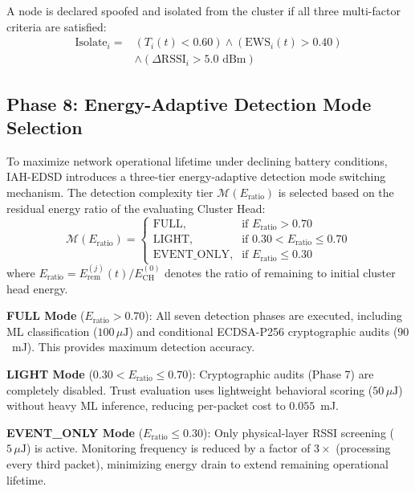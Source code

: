\documentclass[journal]{IEEEtran}
\begin{document}
A node is declared spoofed and isolated from the cluster if all three multi-factor criteria are satisfied:
\begin{equation}
\begin{aligned}
\text{Isolate}_i = &\left( T_i(t) < 0.60 \right) \land \left( \text{EWS}_i(t) > 0.40 \right) \\
&\land \left( \Delta \text{RSSI}_i > 5.0 \text{ dBm} \right)
\end{aligned}
\end{equation}

\subsection{Phase 8: Energy-Adaptive Detection Mode Selection}
To maximize network operational lifetime under declining battery conditions, IAH-EDSD introduces a three-tier energy-adaptive detection mode switching mechanism. The detection complexity tier $\mathcal{M}(E_{\text{ratio}})$ is selected based on the residual energy ratio of the evaluating Cluster Head:
\begin{equation}
\mathcal{M}(E_{\text{ratio}}) = \begin{cases}
\text{FULL}, & \text{if } E_{\text{ratio}} > 0.70 \\
\text{LIGHT}, & \text{if } 0.30 < E_{\text{ratio}} \leq 0.70 \\
\text{EVENT\_ONLY}, & \text{if } E_{\text{ratio}} \leq 0.30
\end{cases}
\end{equation}
where $E_{\text{ratio}} = E_{\text{rem}}^{(j)}(t) / E_{\text{CH}}^{(0)}$ denotes the ratio of remaining to initial cluster head energy.

\textbf{FULL Mode} ($E_{\text{ratio}} > 0.70$): All seven detection phases are executed, including ML classification ($100\,\mu\text{J}$) and conditional ECDSA-P256 cryptographic audits ($90$~mJ). This provides maximum detection accuracy.

\textbf{LIGHT Mode} ($0.30 < E_{\text{ratio}} \leq 0.70$): Cryptographic audits (Phase 7) are completely disabled. Trust evaluation uses lightweight behavioral scoring ($50\,\mu\text{J}$) without heavy ML inference, reducing per-packet cost to $0.055$~mJ.

\textbf{EVENT\_ONLY Mode} ($E_{\text{ratio}} \leq 0.30$): Only physical-layer RSSI screening ($5\,\mu\text{J}$) is active. Monitoring frequency is reduced by a factor of $3\times$ (processing every third packet), minimizing energy drain to extend remaining operational lifetime.
\end{document}
